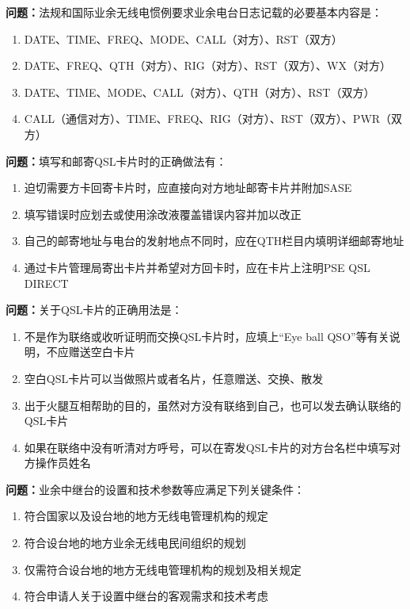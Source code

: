\textbf{问题：}法规和国际业余无线电惯例要求业余电台日志记载的必要基本内容是：
\begin{enumerate}[label=\Alph*), leftmargin=1cm]
	\item DATE、TIME、FREQ、MODE、CALL（对方）、RST（双方）
	\item DATE、FREQ、QTH（对方）、RIG（对方）、RST（双方）、WX（对方）
	\item DATE、TIME、MODE、CALL（对方）、QTH（对方）、RST（双方）
	\item CALL（通信对方）、TIME、FREQ、RIG（对方）、RST（双方）、PWR（双方）
\end{enumerate}

\textbf{问题：}填写和邮寄QSL卡片时的正确做法有：
\begin{enumerate}[label=\Alph*), leftmargin=1cm]
	\item 迫切需要方卡回寄卡片时，应直接向对方地址邮寄卡片并附加SASE
	\item 填写错误时应划去或使用涂改液覆盖错误内容并加以改正
	\item 自己的邮寄地址与电台的发射地点不同时，应在QTH栏目内填明详细邮寄地址
	\item 通过卡片管理局寄出卡片并希望对方回卡时，应在卡片上注明PSE QSL DIRECT
\end{enumerate}

\textbf{问题：}关于QSL卡片的正确用法是：
\begin{enumerate}[label=\Alph*), leftmargin=1cm]
	\item 不是作为联络或收听证明而交换QSL卡片时，应填上“Eye ball QSO”等有关说明，不应赠送空白卡片
	\item 空白QSL卡片可以当做照片或者名片，任意赠送、交换、散发
	\item 出于火腿互相帮助的目的，虽然对方没有联络到自己，也可以发去确认联络的QSL卡片
	\item 如果在联络中没有听清对方呼号，可以在寄发QSL卡片的对方台名栏中填写对方操作员姓名
\end{enumerate}

\textbf{问题：}业余中继台的设置和技术参数等应满足下列关键条件：
\begin{enumerate}[label=\Alph*), leftmargin=1cm]
	\item 符合国家以及设台地的地方无线电管理机构的规定
	\item 符合设台地的地方业余无线电民间组织的规划
	\item 仅需符合设台地的地方无线电管理机构的规划及相关规定
	\item 符合申请人关于设置中继台的客观需求和技术考虑
\end{enumerate}

